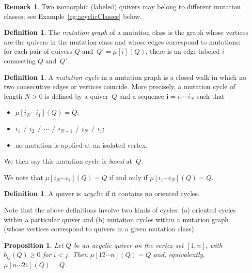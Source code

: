 \documentclass[11pt, letterpaper]{amsart}
\newtheorem{proposition}[theorem]{Proposition}
\theoremstyle{definition}
\newtheorem{remark}[theorem]{Remark}
\newtheorem{definition}[theorem]{Definition}
\numberwithin{equation}{section}
\newcommand{\T}[2]{\mu[#1](#2)} %
\begin{document}
\begin{remark}
Two isomorphic (labeled) quivers may belong to different mutation classes; see Example~\ref{eg:acyclicClasses} below.  
\end{remark}

\begin{definition}
\label{def:mutationGraph}
The \emph{mutation graph} of a mutation class is the graph whose vertices are the quivers in the mutation class 
and whose edges correspond to mutations: for each pair of quivers $Q$ and~$Q'=\T{i}{Q}$, there is an edge
labeled $i$ connecting $Q$ and~$Q'$.  
\end{definition}

\begin{definition}
\label{def:mutation cycle}
A \emph{mutation cycle} in a mutation graph is a closed walk in which no two consecutive edges or vertices coincide. 
More precisely, a mutation cycle of length $N>0$ is defined by a quiver~$Q$ and a sequence $\mathbf{i}=i_1\cdots i_N$ such that
\begin{itemize}[leftmargin=.2in]
\item 
$\mu[i_N\cdots i_1](Q)=Q$; 
\item
$i_1\neq i_2\neq \cdots\neq i_{N-1}\neq i_N\neq i_1$; 
\item
no mutation is applied at an isolated vertex. 
\end{itemize}
We then say this mutation cycle is \emph{based} at~$Q$. 

We note that $\mu[i_N\cdots i_1](Q)=Q$ if and only if $\mu[i_1\cdots i_N](Q)=Q$.
\end{definition}

\begin{definition}
\label{def:acyclic}
A quiver is \emph{acyclic} if it contains no oriented cycles. 
\end{definition}

Note that the above definitions involve two kinds of cycles:
(a) oriented cycles within a particular quiver and 
(b) mutation cycles within a mutation graph (whose vertices correspond to quivers in a given mutation class).

\begin{proposition}
\label{pr:acyclic-mutation-cycle}
Let $Q$ be an acyclic quiver on the vertex set $[1,n]$,
with $b_{ij}(Q)\ge 0$ for $i<j$. 
Then $\T{12\cdots n}{Q}=Q$ and, equivalently,  $\T{n \cdots 21}{Q}=Q$.
\end{proposition}
\end{document}
